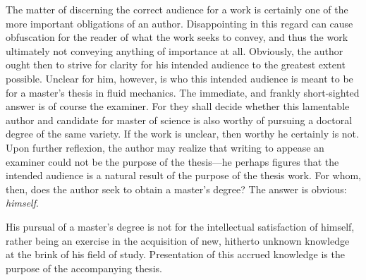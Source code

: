 The matter of discerning the correct audience for a work is certainly one of the more important obligations of an author.
Disappointing in this regard can cause obfuscation for the reader of what the work seeks to convey, and thus the work ultimately not conveying anything of importance at all.
Obviously, the author ought then to strive for clarity for his intended audience to the greatest extent possible.
Unclear for him, however, is who this intended audience is meant to be for a master's thesis in fluid mechanics.
The immediate, and frankly short-sighted answer is of course the examiner.
For they shall decide whether this lamentable author and candidate for master of science is also worthy of pursuing a doctoral degree of the same variety.
If the work is unclear, then worthy he certainly is not.
Upon further reflexion, the author may realize that writing to appease an examiner could not be the purpose of the thesis---he perhaps figures that the intended audience is a natural result of the purpose of the thesis work.
For whom, then, does the author seek to obtain a master's degree?
The answer is obvious: \emph{himself}.

His pursual of a master's degree is not for the intellectual satisfaction of himself, rather being an exercise in the acquisition of new, hitherto unknown knowledge at the brink of his field of study.
Presentation of this accrued knowledge is the purpose of the accompanying thesis.
